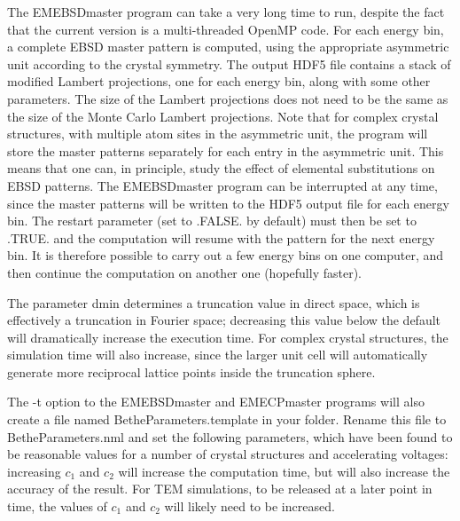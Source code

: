 \documentclass[DIV=calc, paper=letter, fontsize=11pt]{scrartcl}	 %
\begin{document}
The \textsf{EMEBSDmaster} program can take a very long time to run, despite the fact that the current version is a multi-threaded OpenMP code.
For each energy bin, a complete EBSD master pattern is computed, using the appropriate asymmetric unit according to
the crystal symmetry.  The output HDF5 file contains a stack of modified Lambert projections, one for each energy bin, along with 
some other parameters.  The size of the Lambert projections does not need to be the same as the size of the Monte Carlo
Lambert projections.  %
Note that for complex crystal structures,
with multiple atom sites in the asymmetric unit, the program will store the master patterns separately for each entry in the asymmetric unit.
This means that one can, in principle, study the effect of elemental substitutions on EBSD patterns.  The \textsf{EMEBSDmaster}
program can be interrupted at any time, since the master patterns will be written to the HDF5 output file for each energy bin.
The \textsf{restart} parameter (set to \textsf{.FALSE.} by default) must then be set to \textsf{.TRUE.} and the computation will
resume with the pattern for the next energy bin.  It is therefore possible to carry out a few energy bins on one computer, and then
continue the computation on another one (hopefully faster).

The parameter \textsf{dmin} determines a truncation value in direct space, which is effectively a truncation in Fourier space; decreasing
this value below the default will dramatically increase the execution time.  For complex crystal structures, the simulation time will also
increase, since the larger unit cell will automatically generate more reciprocal lattice points inside the truncation sphere.


The \textsf{-t} option to the \textsf{EMEBSDmaster} and \textsf{EMECPmaster} programs will also create a file named \textsf{BetheParameters.template} in
your folder.  Rename this file to \textsf{BetheParameters.nml} and set the following parameters, which have been found to be 
reasonable values for a number of crystal structures and accelerating voltages:
increasing $c_1$ and $c_2$ will increase the computation time, but will also increase the accuracy of the result. For TEM simulations,
to be released at a later point in time, the values of $c_1$ and $c_2$ will likely need to be increased.
\end{document}
